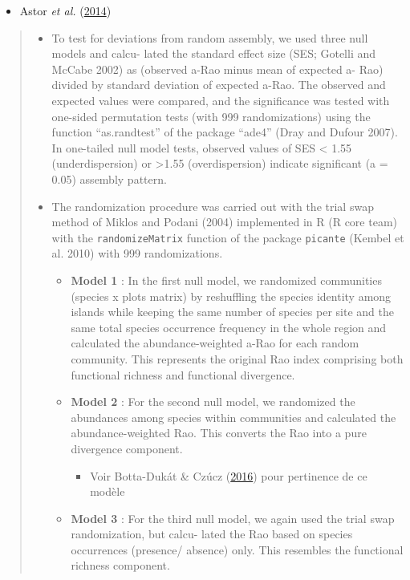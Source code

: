 \documentclass[]{article}
\providecommand{\tightlist}{%
  \setlength{\itemsep}{0pt}\setlength{\parskip}{0pt}}
\begin{document}
\begin{itemize}
\tightlist
\item
  Astor \emph{et al.}
  (\protect\hyperlink{ref-astor2014trait_dispersion}{2014})
\end{itemize}

\begin{quote}
\begin{itemize}
\tightlist
\item
  To test for deviations from random assembly, we used three null models
  and calcu- lated the standard effect size (SES; Gotelli and McCabe
  2002) as (observed a-Rao minus mean of expected a- Rao) divided by
  standard deviation of expected a-Rao. The observed and expected values
  were compared, and the significance was tested with one-sided
  permutation tests (with 999 randomizations) using the function
  ``as.randtest'' of the package ``ade4'' (Dray and Dufour 2007). In
  one-tailed null model tests, observed values of SES \textless{} 1.55
  (underdispersion) or \textgreater{}1.55 (overdispersion) indicate
  significant (a = 0.05) assembly pattern.
\item
  The randomization procedure was carried out with the trial swap method
  of Miklos and Podani (2004) implemented in R (R core team) with the
  \texttt{randomizeMatrix} function of the package \texttt{picante}
  (Kembel et al. 2010) with 999 randomizations.

  \begin{itemize}
  \tightlist
  \item
    \textbf{Model 1} : In the first null model, we randomized
    communities (species x plots matrix) by reshuffling the species
    identity among islands while keeping the same number of species per
    site and the same total species occurrence frequency in the whole
    region and calculated the abundance-weighted a-Rao for each random
    community. This represents the original Rao index comprising both
    functional richness and functional divergence.
  \item
    \textbf{Model 2} : For the second null model, we randomized the
    abundances among species within communities and calculated the
    abundance-weighted Rao. This converts the Rao into a pure divergence
    component.

    \begin{itemize}
    \tightlist
    \item
       Voir Botta-Dukát \& Czúcz
      (\protect\hyperlink{ref-botta_dukat2016}{2016}) pour pertinence de
      ce modèle 
    \end{itemize}
  \item
    \textbf{Model 3} : For the third null model, we again used the trial
    swap randomization, but calcu- lated the Rao based on species
    occurrences (presence/ absence) only. This resembles the functional
    richness component.
  \end{itemize}
\end{itemize}
\end{quote}
\end{document}
